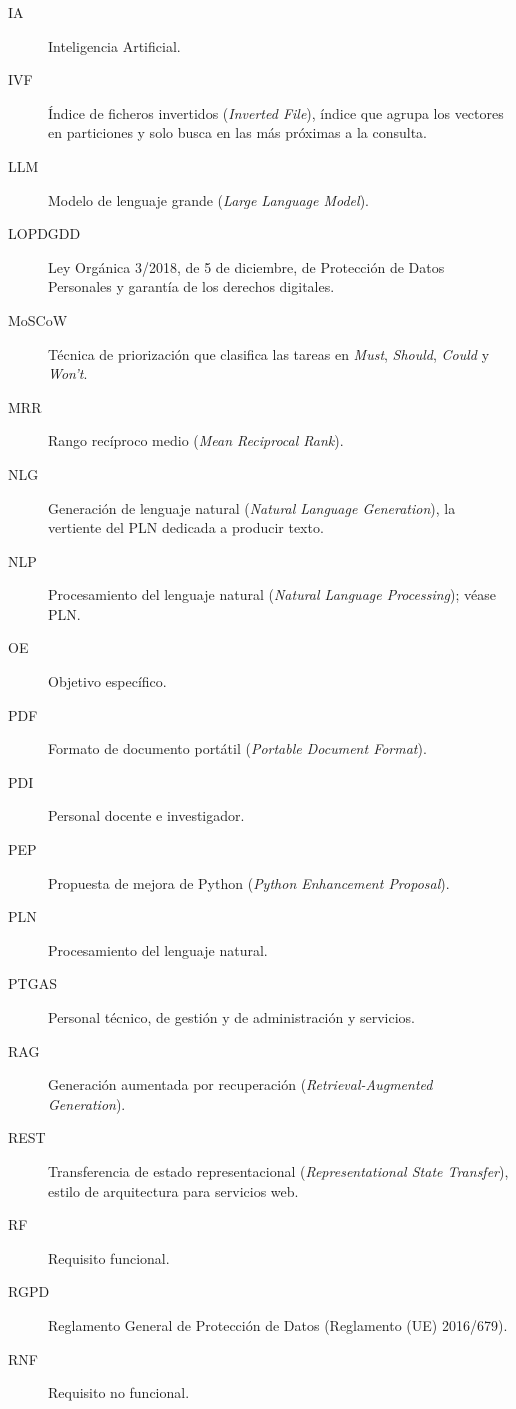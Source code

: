 \begin{description}
  \item[IA] Inteligencia Artificial.
  \item[IVF] Índice de ficheros invertidos (\textit{Inverted File}), índice que agrupa los vectores en particiones y solo busca en las más próximas a la consulta.
  \item[LLM] Modelo de lenguaje grande (\textit{Large Language Model}).
  \item[LOPDGDD] Ley Orgánica 3/2018, de 5 de diciembre, de Protección de Datos Personales y garantía de los derechos digitales.
  \item[MoSCoW] Técnica de priorización que clasifica las tareas en
        \textit{Must}, \textit{Should}, \textit{Could} y \textit{Won't}.
  \item[MRR] Rango recíproco medio (\textit{Mean
          Reciprocal Rank}).
  \item[NLG] Generación de lenguaje natural (\textit{Natural Language
          Generation}), la vertiente del PLN dedicada a producir texto.
  \item[NLP] Procesamiento del lenguaje natural (\textit{Natural Language
          Processing}); véase PLN.
  \item[OE] Objetivo específico.
  \item[PDF] Formato de documento portátil (\textit{Portable Document Format}).
  \item[PDI] Personal docente e investigador.
  \item[PEP] Propuesta de mejora de Python (\textit{Python Enhancement Proposal}).
  \item[PLN] Procesamiento del lenguaje natural.
  \item[PTGAS] Personal técnico, de gestión y de administración y servicios.
  \item[RAG] Generación aumentada por recuperación (\textit{Retrieval-Augmented Generation}).
  \item[REST] Transferencia de estado representacional (\textit{Representational State Transfer}), estilo de arquitectura para servicios web.
  \item[RF] Requisito funcional.
  \item[RGPD] Reglamento General de Protección de Datos (Reglamento (UE) 2016/679).
  \item[RNF] Requisito no funcional.

\end{description}
